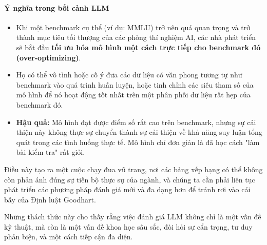 \paragraph{Ý nghĩa trong bối cảnh LLM}
\begin{itemize}
    \item Khi một benchmark cụ thể (ví dụ: MMLU) trở nên quá quan trọng và trở thành mục tiêu tối thượng của các phòng thí nghiệm AI, các nhà phát triển sẽ bắt đầu \textbf{tối ưu hóa mô hình một cách trực tiếp cho benchmark đó (over-optimizing)}.
    \item Họ có thể vô tình hoặc cố ý đưa các dữ liệu có văn phong tương tự như benchmark vào quá trình huấn luyện, hoặc tinh chỉnh các siêu tham số của mô hình để nó hoạt động tốt nhất trên một phân phối dữ liệu rất hẹp của benchmark đó.
    \item \textbf{Hậu quả:} Mô hình đạt được điểm số rất cao trên benchmark, nhưng sự cải thiện này không thực sự chuyển thành sự cải thiện về khả năng suy luận tổng quát trong các tình huống thực tế. Mô hình chỉ đơn giản là đã học cách "làm bài kiểm tra" rất giỏi.
\end{itemize}

Điều này tạo ra một cuộc chạy đua vũ trang, nơi các bảng xếp hạng có thể không còn phản ánh đúng sự tiến bộ thực sự của ngành, và chúng ta cần phải liên tục phát triển các phương pháp đánh giá mới và đa dạng hơn để tránh rơi vào cái bẫy của Định luật Goodhart.

Những thách thức này cho thấy rằng việc đánh giá LLM không chỉ là một vấn đề kỹ thuật, mà còn là một vấn đề khoa học sâu sắc, đòi hỏi sự cẩn trọng, tư duy phản biện, và một cách tiếp cận đa diện.